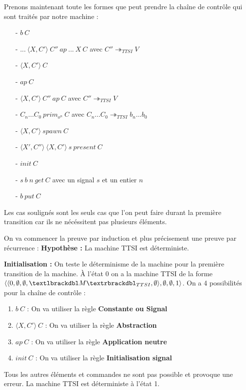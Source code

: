 \documentclass[10pt,a4paper]{report}
\begin{document}
	Prenons maintenant toute les formes que peut prendre la chaîne de contrôle qui sont traités par notre machine :
	\begin{itemize}
		\item[-] \underline{$b~C$} 
		\item[-] $...~\langle X,C'\rangle~C''~ap~...~X~C$ avec $C'' \twoheadrightarrow_{TTSI} V$
		\item[-] \underline{$\langle X,C'\rangle~C$}
		\item[-] \underline{$ap~C$}
		\item[-] $\langle X,C'\rangle~C''~ap~C$ avec $C'' \twoheadrightarrow_{TTSI} V$
		\item[-] $C_{n}...C_{0}~prim_{o^{n}}~C$ avec $C_{n}...C_{0} \twoheadrightarrow_{TTSI} b_{n}...b_{0}$
		\item[-] $\langle X,C'\rangle~spawn~C$
		\item[-] $\langle X',C''\rangle~\langle X,C'\rangle~s~present~C$
		\item[-] \underline{$init~C$}
		\item[-] $s~b~n~get~C$ avec un signal $s$ et un entier $n$
		\item[-] $b~put~C$
	\end{itemize}
	Les cas soulignés sont les seuls cas que l'on peut faire durant la première transition car ils ne nécéssitent pas plusieurs éléments.
	\bigbreak
	
	
	On va commencer la preuve par induction et plus précisement une preuve par récurrence :
	\smallbreak
	\textbf{Hypothèse :} La machine TTSI est déterministe.
	\bigbreak
	
	
	\textbf{Initialisation :}  On teste le déterminisme de la machine pour la première transition de la machine. À l'état 0 on a la machine TTSI de la forme $\langle\langle 0,\emptyset,\emptyset,\textlbrackdbl M\textrbrackdbl_{TTSI},\emptyset\rangle,\emptyset,\emptyset,1\rangle$. 
	On a 4 possibilités pour la chaîne de contrôle :
	\smallbreak
	\begin{enumerate}
		\item $b~C$ : On va utiliser la règle \textbf{Constante ou Signal}
		\smallbreak
		\item $\langle X,C'\rangle~C$ : On va utiliser la règle \textbf{Abstraction}
		\smallbreak
		\item $ap~C$ : On va utiliser la règle \textbf{Application neutre}
		\smallbreak
		\item $init~C$ : On va utiliser la règle \textbf{Initialisation signal}
	\end{enumerate}
	Tous les autres éléments et commandes ne sont pas possible et provoque une erreur. La machine TTSI est déterministe à l'état 1.
	\bigbreak
	
\end{document}
